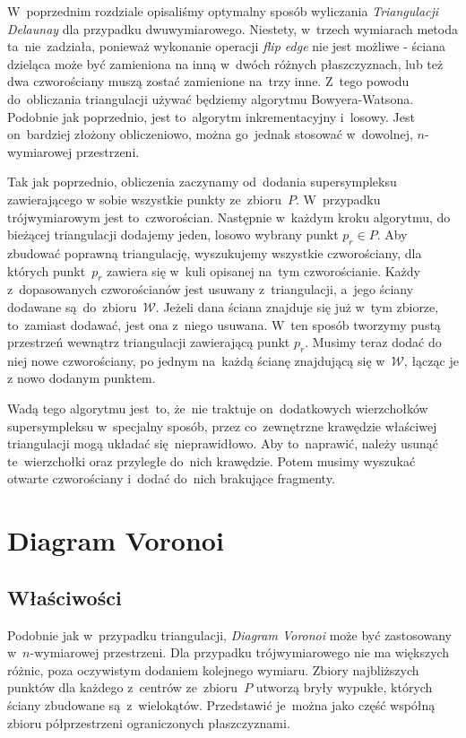 \documentclass[skorowidz,autorrok,backref,xodstep,oswiadczenie]{wmimgr}
\begin{document}
W~poprzednim rozdziale opisaliśmy optymalny sposób wyliczania \emph{Triangulacji Delaunay} dla przypadku dwuwymiarowego. Niestety, w~trzech wymiarach metoda ta~nie~zadziała, ponieważ wykonanie operacji \emph{flip edge} nie jest możliwe - ściana dzieląca może być zamieniona na inną w~dwóch różnych płaszczyznach, lub też dwa czworościany muszą zostać zamienione na~trzy inne. Z~tego powodu do~obliczania triangulacji używać będziemy algorytmu Bowyera-Watsona. Podobnie jak poprzednio, jest to~algorytm inkrementacyjny i~losowy. Jest on~bardziej złożony obliczeniowo, można go~jednak stosować w~dowolnej, $n$-wymiarowej przestrzeni.

Tak jak poprzednio, obliczenia zaczynamy od~dodania supersympleksu zawierającego w sobie wszystkie punkty ze~zbioru~$P$. W~przypadku trójwymiarowym jest to~czworościan. Następnie w~każdym kroku algorytmu, do bieżącej triangulacji dodajemy jeden, losowo wybrany punkt $p_{r} \in P$. Aby zbudować poprawną triangulację, wyszukujemy wszystkie czworościany, dla których punkt~$p_{r}$ zawiera się w~kuli opisanej na~tym czworościanie. Każdy z~dopasowanych czworościanów jest usuwany z~triangulacji, a~jego ściany dodawane są~do~zbioru~$\mathcal{W}$. Jeżeli dana ściana znajduje się już w~tym zbiorze, to~zamiast dodawać, jest ona z~niego usuwana. W~ten sposób tworzymy pustą przestrzeń wewnątrz triangulacji zawierającą punkt $p_{r}$. Musimy teraz dodać do niej nowe czworościany, po jednym na~każdą ścianę znajdującą się w~$\mathcal{W}$, łącząc je z nowo dodanym punktem.

Wadą tego algorytmu jest~to, że~nie traktuje on~dodatkowych wierzchołków supersympleksu w~specjalny sposób, przez co~zewnętrzne krawędzie właściwej triangulacji mogą układać się~nieprawidłowo. Aby to~naprawić, należy usunąć te~wierzchołki oraz przyległe do~nich krawędzie. Potem musimy wyszukać otwarte czworościany i~dodać do~nich brakujące fragmenty.

\section{Diagram Voronoi}

\subsection{Właściwości}

Podobnie jak w~przypadku triangulacji, \emph{Diagram Voronoi} może być zastosowany w~$n$-wymiarowej przestrzeni. Dla przypadku trójwymiarowego nie ma większych różnic, poza oczywistym dodaniem kolejnego wymiaru. Zbiory najbliższych punktów dla każdego z~centrów ze~zbioru~$P$ utworzą bryły wypukłe, których ściany zbudowane są~z~wielokątów. Przedstawić je~można jako część współną zbioru półprzestrzeni ograniczonych płaszczyznami.
\end{document}
